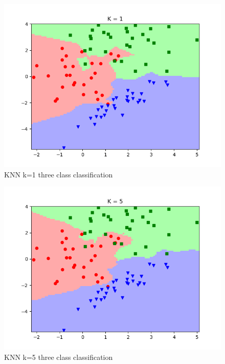 \documentclass[10pt]{article}
\begin{document}
\begin{itemize}
\begin{figure}[H]
\centering
  \includegraphics[width=\linewidth]{code/knn_three_class_data-k-1.png}
 \caption{KNN k=1 three class classification}
\label{label}
\end{figure}

\begin{figure}[H]
\centering
  \includegraphics[width=\linewidth]{code/knn_three_class_data-k-5.png}
 \caption{KNN k=5 three class classification}
\label{label}
\end{figure}


\end{itemize}
\end{document}
